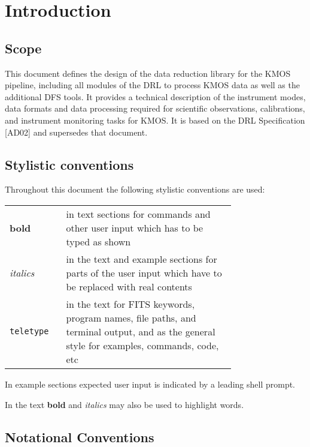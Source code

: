 \section{Introduction}
\label{sec:introduction}

\subsection{Scope}
\label{sec:scope}

This document defines the design of the data reduction library for the KMOS pipeline, including
all modules of the DRL to process KMOS data as well as the additional DFS tools. It provides a
technical description of the instrument modes, data formats and data processing required for
scientific observations, calibrations, and instrument monitoring tasks for KMOS. It is based on
the DRL Specification [AD02] and supersedes that document.


\subsection{Stylistic conventions}
\label{sec:style}

Throughout this document the following stylistic conventions are used:

\begin{tabular}{lp{0.75\linewidth}}
\textbf{bold}     & in text sections for commands and other
                    user input which has to be typed as shown \\
\textit{italics}  & in the text and example sections for parts of the user
                    input which have to be replaced with real contents \\
\texttt{teletype} & in the text for FITS keywords, program names, file paths,
                    and terminal output, and as the general style for examples,
                    commands, code, etc \\
\end{tabular}

In example sections expected user input is indicated by a leading shell
prompt.

In the text \textbf{bold} and \textit{italics} may also be used to highlight
words.

\subsection{Notational Conventions}
\label{sec:notation}

